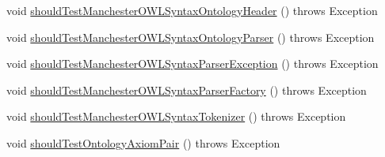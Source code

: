 \begin{DoxyCompactItemize}
\item 
void \hyperlink{classorg_1_1semanticweb_1_1owlapi_1_1contract_1_1_contract_manchesterowlsyntax_test_a32b3506557ee3ed3609eedae0b0a8f36}{should\-Test\-Manchester\-O\-W\-L\-Syntax\-Ontology\-Header} ()  throws Exception 
\item 
void \hyperlink{classorg_1_1semanticweb_1_1owlapi_1_1contract_1_1_contract_manchesterowlsyntax_test_ab8da0854399d6282fed724360ce4ff83}{should\-Test\-Manchester\-O\-W\-L\-Syntax\-Ontology\-Parser} ()  throws Exception 
\item 
void \hyperlink{classorg_1_1semanticweb_1_1owlapi_1_1contract_1_1_contract_manchesterowlsyntax_test_a2960b6dd77f25c4d7c37965450be6412}{should\-Test\-Manchester\-O\-W\-L\-Syntax\-Parser\-Exception} ()  throws Exception 
\item 
void \hyperlink{classorg_1_1semanticweb_1_1owlapi_1_1contract_1_1_contract_manchesterowlsyntax_test_aad5a134830a177856d46ee5a5f982e6b}{should\-Test\-Manchester\-O\-W\-L\-Syntax\-Parser\-Factory} ()  throws Exception 
\item 
void \hyperlink{classorg_1_1semanticweb_1_1owlapi_1_1contract_1_1_contract_manchesterowlsyntax_test_a54a134b1efa37a558eeaed3032225bb2}{should\-Test\-Manchester\-O\-W\-L\-Syntax\-Tokenizer} ()  throws Exception 
\item 
void \hyperlink{classorg_1_1semanticweb_1_1owlapi_1_1contract_1_1_contract_manchesterowlsyntax_test_a3c61540df4525284124de21ec64d209e}{should\-Test\-Ontology\-Axiom\-Pair} ()  throws Exception 
\end{DoxyCompactItemize}


